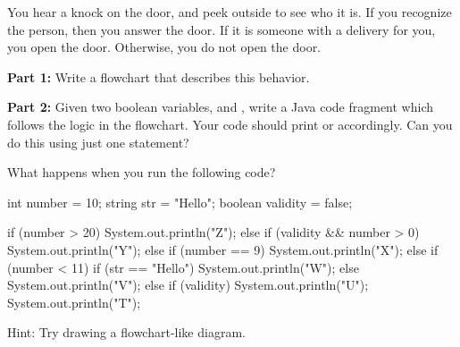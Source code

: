 \begin{exercise}
You hear a knock on the door, and peek outside to see who it is. If you recognize the person, then you answer the door. If it is someone with a delivery for you, you open the door. Otherwise, you do not open the door. 

\textbf{Part 1:} Write a flowchart that describes this behavior.

\textbf{Part 2:} Given two boolean variables,  and , write a Java code fragment which follows the logic in the flowchart. Your code should print  or  accordingly. Can you do this using just one  statement?
\end{exercise}

\begin{exercise}
What happens when you run the following code?

\begin{code}
int number = 10;
string str = "Hello";
boolean validity = false;

if (number > 20) 
{
    System.out.println("Z");
}
else 
{
    if (validity && number > 0) 
    {
        System.out.println("Y");
    } 
    else if (number == 9) 
    {
        System.out.println("X");
    } 
    else if (number < 11) 
    {
        if (str == "Hello") 
        {
            System.out.println("W");
        } 
        else 
        {
            System.out.println("V");
        }
    } 
    else 
    {
        if (validity) 
        {
            System.out.println("U");
        } 
    } 
    System.out.println("T");
}
\end{code}

Hint: Try drawing a flowchart-like diagram.

\end{exercise}











